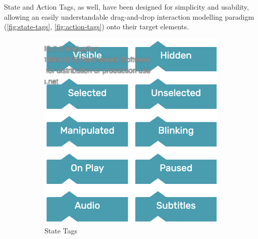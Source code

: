 State and Action Tags, as well, have been designed for simplicity and usability, allowing an easily understandable drag-and-drop interaction modelling paradigm (\autoref{fig:state-tags}, \autoref{fig:action-tags}) onto their target elements.
\begin{figure}[h]
    \begin{subfigure}{0.4\textwidth}
        \centering
        \includegraphics[width=\columnwidth]{Figures/Editor/state-tag.png}
        \caption{State Tags}
        \label{fig:state-tags}
    \end{subfigure}
    \hfill
    \begin{subfigure}{0.4\textwidth}
        \centering

\end{subfigure}
\end{figure}
